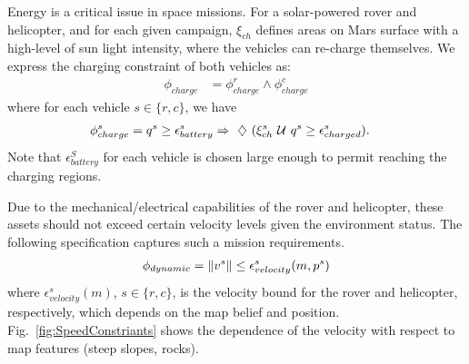 \documentclass[conference]{IEEEtran}
\begin{document}
\noindent{} Energy is a critical issue in space missions. For a solar-powered rover and helicopter, and for each given campaign, $\xi_{ch}$ defines areas on Mars surface with a high-level of sun light intensity, where the vehicles can re-charge themselves. We express the charging constraint of both vehicles as:
 	\begin{align}
	    \phi_{charge} &= \phi_{charge}^r \land \phi_{charge}^c
	\end{align}
	where for each vehicle $s \in \{r, c\}$, we have
	\begin{align}
	    \phi_{charge}^s &= q^s \geq \epsilon_{battery}^s \Rightarrow \ \diamondsuit\  (\xi^s_{ch} \ \mathcal{U}\  q^s \geq \epsilon_{charged}^s).
	\end{align}
	Note that $\epsilon_{battery}^S$ for each vehicle is chosen large enough to permit reaching the charging regions.

\noindent{} Due to the mechanical/electrical capabilities of the rover and helicopter, these assets should not exceed certain velocity levels given the environment status. The following specification captures such a mission requirements.
    \begin{align}
	    \phi_{dynamic} = \left\| {v^s} \right\| \leq \epsilon_{velocity}^s(m, p^s)
	\end{align}
	where $\epsilon_{velocity}^s(m)$, $s\in \{r, c\}$, is the velocity
	bound for the rover and helicopter, respectively, which depends on the map belief and position.
	Fig.~\ref{fig:SpeedConstriants} shows the dependence of the velocity with respect to
	map features (steep slopes, rocks).
	


	
	
	
	
\end{document}
